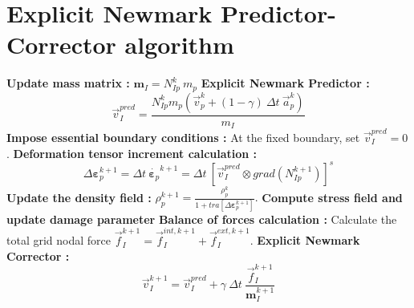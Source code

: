 \documentclass[preprint,12pt,a4paper]{elsarticle}
\newcommand{\tens}[1]{
  \ensuremath{\mathbf{{#1}}}
}
\newcommand\Grad[1]{grad({#1})}
\begin{document}
\section{Explicit Newmark Predictor-Corrector algorithm}
\label{sec:expl-pred-corr}
\begin{algorithm}[H]
  \DontPrintSemicolon
    \textbf{Update mass matrix :} $ \tens{m}_{I} = N_{Ip}^{k}\ m_p$ \;
    \textbf{Explicit Newmark Predictor :}
    \begin{equation*}
      \vec{v}_I^{pred} = \frac{ N_{Ip}^{k} m_p (\vec{v}_p^k + (1 - \gamma)\ \Delta t\ \vec{a}_p^k)}{m_I}
    \end{equation*}\;
    \textbf{Impose essential boundary conditions :} At the fixed
    boundary, set $\vec{v}_{I}^{pred} = 0$.\; 
    \textbf{Deformation tensor increment calculation :}
    \begin{equation*}
      \Delta \tens{\varepsilon}_{p}^{k+1} = \Delta t\
        \dot{\tens{\varepsilon}_{p}}^{k+1} = \Delta t\ \left[ \vec{v}_{I}^{pred} \otimes
        \Grad{N_{Ip}^{k+1}} \right]^s
    \end{equation*} \;
    \textbf{Update the density field :} $\rho_p^{k+1} =
    \frac{\rho_p^k}{1 + \mathit{tra}\left[\Delta\tens{\varepsilon}_{p}^{k+1}\right]}.$\;
    \textbf{Compute stress field and update damage parameter}\;
    \textbf{Balance of forces calculation :} Calculate the total grid
    nodal force $\vec{f}_{I}^{k+1} = \vec{f}_{I}^{int,k+1} + \vec{f}_{I}^{ext,k+1}$.\;
    \textbf{Explicit Newmark Corrector :}
    \begin{equation*}
      \vec{v}_{I}^{k+1} = \vec{v}_{I}^{pred} + \gamma\ \Delta t\ \frac{\vec{f}_{I}^{k+1}}{\tens{m}_I^{k+1}}  
    \end{equation*}\;

\end{algorithm}
\end{document}
